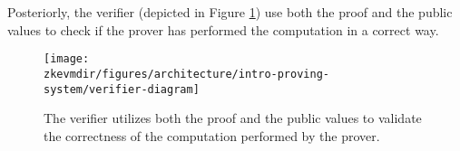 Posteriorly, the verifier (depicted in Figure \ref{fig:verifier-diagram}) use both the proof and the public values to check if the prover has performed the computation in a correct way.

\begin{figure}[H]
\centering
\texttt{[image: \\zkevmdir/figures/architecture/intro-proving-system/verifier-diagram]}
\caption{The verifier utilizes both the proof and the public values to validate the correctness of the computation performed by the prover.}
\label{fig:verifier-diagram}
\end{figure}





